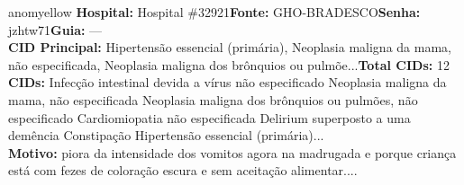\documentclass[a4paper,10pt]{article}
\begin{document}
\begin{anomalycard}[Interna\c{c}\~{a}o \#118167 | Pac. \#98053 | MODERADO (z=2.41) | LOS: 4d | 22/02/2026\,$\to$\,26/02/2026]{anomyellow}
\textbf{Hospital:} Hospital \#32921\quad \textbf{Fonte:} GHO-BRADESCO\quad \textbf{Senha:} jzhtw71\quad \textbf{Guia:} ---\\

\textbf{CID Principal:} {\small Hipertensão essencial (primária), Neoplasia maligna da mama, não especificada, Neoplasia maligna dos brônquios ou pulmõe...}\quad\textbf{Total CIDs:} 12\\

\textbf{CIDs:} {\scriptsize Infecção intestinal devida a vírus não especificado \textbar{} Neoplasia maligna da mama, não especificada \textbar{} Neoplasia maligna dos brônquios ou pulmões, não especificado \textbar{} Cardiomiopatia não especificada \textbar{} Delirium superposto a uma demência \textbar{} Constipação \textbar{} Hipertensão essencial (primária)...}\\

\textbf{Motivo:} {\scriptsize piora da intensidade dos vomitos agora na madrugada e porque criança está com fezes de coloração escura e sem aceitação alimentar....}\\




\end{anomalycard}
\end{document}
